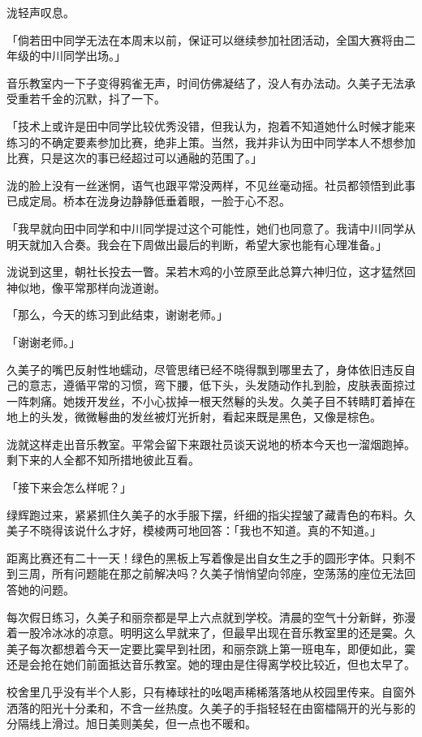 \documentclass[UTF8]{ctexart}
\begin{document}
    泷轻声叹息。 

    「倘若田中同学无法在本周末以前，保证可以继续参加社团活动，全国大赛将由二年级的中川同学出场。」 

    音乐教室内一下子变得鸦雀无声，时间仿佛凝结了，没人有办法动。久美子无法承受重若千金的沉默，抖了一下。 

    「技术上或许是田中同学比较优秀没错，但我认为，抱着不知道她什么时候才能来练习的不确定要素参加比赛，绝非上策。当然，我并非认为田中同学本人不想参加比赛，只是这次的事已经超过可以通融的范围了。」 

    泷的脸上没有一丝迷惘，语气也跟平常没两样，不见丝毫动摇。社员都领悟到此事已成定局。桥本在泷身边静静低垂着眼，一脸于心不忍。 

    「我早就向田中同学和中川同学提过这个可能性，她们也同意了。我请中川同学从明天就加入合奏。我会在下周做出最后的判断，希望大家也能有心理准备。」 

    泷说到这里，朝社长投去一瞥。呆若木鸡的小笠原至此总算六神归位，这才猛然回神似地，像平常那样向泷道谢。 

    「那么，今天的练习到此结束，谢谢老师。」 

    「谢谢老师。」 

    久美子的嘴巴反射性地蠕动，尽管思绪已经不晓得飘到哪里去了，身体依旧违反自己的意志，遵循平常的习惯，弯下腰，低下头，头发随动作扎到脸，皮肤表面掠过一阵刺痛。她拨开发丝，不小心拔掉一根天然鬈的头发。久美子目不转睛盯着掉在地上的头发，微微鬈曲的发丝被灯光折射，看起来既是黑色，又像是棕色。 

    泷就这样走出音乐教室。平常会留下来跟社员谈天说地的桥本今天也一溜烟跑掉。剩下来的人全都不知所措地彼此互看。 

    「接下来会怎么样呢？」 

    绿辉跑过来，紧紧抓住久美子的水手服下摆，纤细的指尖捏皱了藏青色的布料。久美子不晓得该说什么才好，模棱两可地回答：「我也不知道。真的不知道。」 

    距离比赛还有二十一天！绿色的黑板上写着像是出自女生之手的圆形字体。只剩不到三周，所有问题能在那之前解决吗？久美子悄悄望向邻座，空荡荡的座位无法回答她的问题。 

    每次假日练习，久美子和丽奈都是早上六点就到学校。清晨的空气十分新鲜，弥漫着一股冷冰冰的凉意。明明这么早就来了，但最早出现在音乐教室里的还是霙。久美子每次都想着今天一定要比霙早到社团，和丽奈跳上第一班电车，即便如此，霙还是会抢在她们前面抵达音乐教室。她的理由是住得离学校比较近，但也太早了。 

    校舍里几乎没有半个人影，只有棒球社的吆喝声稀稀落落地从校园里传来。自窗外洒落的阳光十分柔和，不含一丝热度。久美子的手指轻轻在由窗櫺隔开的光与影的分隔线上滑过。旭日美则美矣，但一点也不暖和。 
\end{document}
